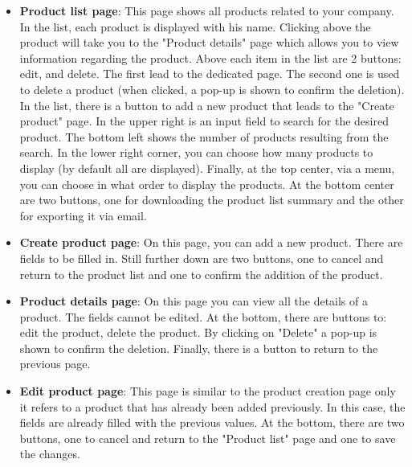 \begin{itemize}
    \item \textbf{Product list page}: This page shows all products related to your company.
In the list, each product is displayed with his name. Clicking above the product will take you to the "Product details" page which allows you to view information regarding the product. Above each item in the list are 2 buttons: edit, and delete. The first lead to the dedicated page. The second one is used to delete a product (when clicked, a pop-up is shown to confirm the deletion). In the list, there is a button to add a new product that leads to the "Create product" page.
In the upper right is an input field to search for the desired product.
The bottom left shows the number of products resulting from the search. In the lower right corner, you can choose how many products to display (by default all are displayed). Finally, at the top center, via a menu, you can choose in what order to display the products.
At the bottom center are two buttons, one for downloading the product list summary and the other for exporting it via email.
    \item \textbf{Create product page}: On this page, you can add a new product. There are fields to be filled in. Still further down are two buttons, one to cancel and return to the product list and one to confirm the addition of the product.
    \item \textbf{Product details page}: On this page you can view all the details of a product. The fields cannot be edited. At the bottom, there are buttons to: edit the product, delete the product. By clicking on "Delete" a pop-up is shown to confirm the deletion. Finally, there is a button to return to the previous page.
    \item \textbf{Edit product page}: This page is similar to the product creation page only it refers to a product that has already been added previously. In this case, the fields are already filled with the previous values. At the bottom, there are two buttons, one to cancel and return to the "Product list" page and one to save the changes.
\end{itemize}
\newpage
